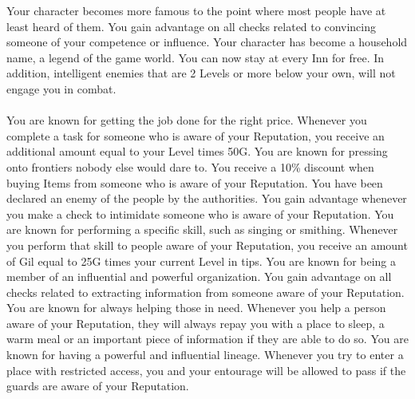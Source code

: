 \documentclass[a4paper, titlepage, 11pt, twocolumn] {article}
\begin{document}
 Your character becomes more famous to the point where most people have at least heard of them. You gain advantage on all checks related to convincing someone of your competence or influence. \newpage
{} Your character has become a household name, a legend of the game world. You can now stay at every Inn for free. In addition, intelligent enemies that are 2 Levels or more below your own, will not engage you in combat.
%
\vfill
%
\\\\
%
 You are known for getting the job done for the right price. Whenever you complete a task for someone who is aware of your Reputation, you receive an additional amount equal to your Level times 50G.\ofrow
%
 You are known for pressing onto frontiers nobody else would dare to. You receive a 10\% discount when buying Items from someone who is aware of your Reputation.\ofrow
%
 You have been declared an enemy of the people by the authorities. You gain advantage whenever you make a check to intimidate someone who is aware of your Reputation. \ofrow
%
 You are known for performing a specific skill, such as singing or smithing. Whenever you perform that skill to people aware of your Reputation, you receive an amount of Gil equal to 25G times your current Level in tips. \ofrow
%
 You are known for being a member of an influential and powerful organization. You gain advantage on all checks related to extracting information from someone aware of your Reputation. \ofrow
%
 You are known for always helping those in need. Whenever you help a person aware of your Reputation, they will always repay you with a place to sleep, a warm meal or an important piece of information if they are able to do so. \ofrow
%
 You are known for having a powerful and influential lineage. Whenever you try to enter a place with restricted access, you and your entourage will be allowed to pass if the guards are aware of your Reputation.
%
\vfill
%
\end{document}
